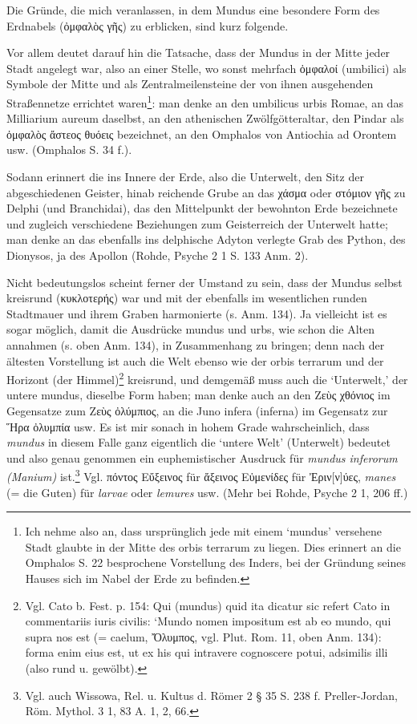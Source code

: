 \documentclass[a4paper, 11pt, oneside]{article}
\begin{document}
Die Gründe, die mich veranlassen, in dem Mundus eine besondere Form des Erdnabels (ὀμφαλὸς γῆς) zu erblicken, sind kurz folgende.

Vor allem deutet darauf hin die Tatsache, dass der Mundus in der Mitte jeder Stadt angelegt war, also an einer Stelle, wo sonst mehrfach ὀμφαλοί (umbilici) als Symbole der Mitte und als Zentralmeilensteine der von ihnen ausgehenden Straßennetze errichtet waren\footnote{Ich nehme also an, dass ursprünglich jede mit einem `mundus' versehene Stadt glaubte in der Mitte des orbis terrarum zu liegen. Dies erinnert an die Omphalos S. 22 besprochene Vorstellung des Inders, bei der Gründung seines Hauses sich im Nabel der Erde zu befinden.}: man denke an den umbilicus urbis Romae, an das Milliarium aureum daselbst, an den athenischen Zwölfgötteraltar, den Pindar als ὀμφαλὸς ἄστεος θυόεις bezeichnet, an den Omphalos von Antiochia ad Orontem usw. (Omphalos S. 34 f.).

Sodann erinnert die ins Innere der Erde, also die Unterwelt, den Sitz der abgeschiedenen Geister, hinab reichende Grube an das χάσμα oder στόμιον γῆς zu Delphi (und Branchidai), das den Mittelpunkt der bewohnton Erde bezeichnete und zugleich verschiedene Beziehungen zum Geisterreich der Unterwelt hatte; man denke an das ebenfalls ins delphische Adyton verlegte Grab des Python, des Dionysos, ja des Apollon (Rohde, Psyche 2 1 S. 133 Anm. 2).

Nicht bedeutungslos scheint ferner der Umstand zu sein, dass der Mundus selbst kreisrund (κυκλοτερής) war und mit der ebenfalls im wesentlichen runden Stadtmauer und ihrem Graben harmonierte (s. Anm. 134). Ja vielleicht ist es sogar möglich, damit die Ausdrücke mundus und urbs, wie schon die Alten annahmen (s. oben Anm. 134), in Zusammenhang zu bringen; denn nach der ältesten Vorstellung ist auch die Welt ebenso wie der orbis terrarum und der Horizont (der Himmel)\footnote{Vgl. Cato b. Fest. p. 154: Qui (mundus) quid ita dicatur sic refert Cato in commentariis iuris civilis: `Mundo nomen impositum est ab eo mundo, qui supra nos est (= caelum, Ὄλυμπος, vgl. Plut. Rom. 11, oben Anm. 134): forma enim eius est, ut ex his qui intravere cognoscere potui, adsimilis illi (also rund u. gewölbt).} kreisrund, und demgemäß muss auch die `Unterwelt,' der untere mundus, dieselbe Form haben; man denke auch an den Ζεὺς χθόνιος im Gegensatze zum Ζεὺς ὀλύμπιος, an die Juno infera (inferna) im Gegensatz zur Ἥρα ὀλυμπία usw. Es ist mir sonach in hohem Grade wahrscheinlich, dass \emph{mundus} in diesem Falle ganz eigentlich die `untere Welt' (Unterwelt) bedeutet und also genau genommen ein euphemistischer Ausdruck für \emph{mundus inferorum (Manium)} ist.\footnote{Vgl. auch Wissowa, Rel. u. Kultus d. Römer 2 § 35 S. 238 f. Preller-Jordan, Röm. Mythol. 3 1, 83 A. 1, 2, 66.} Vgl. πόντος Εὔξεινος für ἄξεινος Εὐμενίδες für Ἐριν[ν]ύες, \emph{manes} (= die Guten) für \emph{larvae} oder \emph{lemures} usw. (Mehr bei Rohde, Psyche 2 1, 206 ff.)
\end{document}
